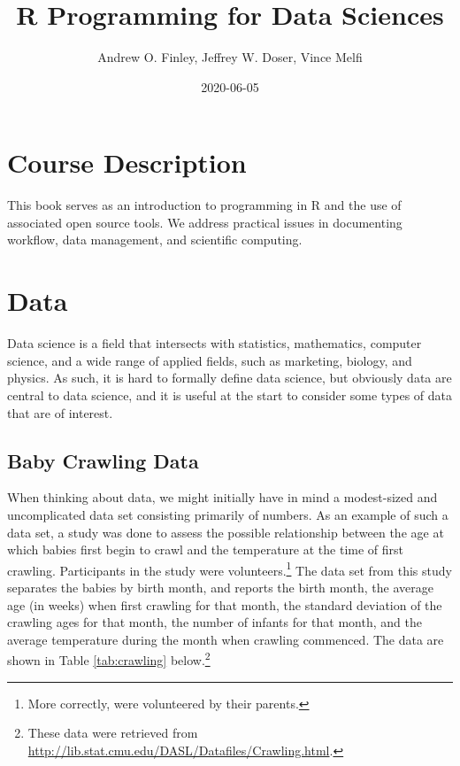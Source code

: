 \documentclass[
]{krantz}
\title{R Programming for Data Sciences}
\author{Andrew O. Finley, Jeffrey W. Doser, Vince Melfi}
\date{2020-06-05}
\begin{document}
\maketitle


\thispagestyle{empty}

\setlength{\abovedisplayskip}{-5pt}
\setlength{\abovedisplayshortskip}{-5pt}

{
\hypersetup{linkcolor=}
\setcounter{tocdepth}{2}
\tableofcontents
}
\listoftables
\listoffigures
\hypertarget{course-description}{%
\chapter*{Course Description}\label{course-description}}


This book serves as an introduction to programming in R and the use of associated open source tools. We address practical issues in documenting workflow, data management, and scientific computing.

\mainmatter

\hypertarget{data}{%
\chapter{Data}\label{data}}

Data science is a field that intersects with statistics, mathematics, computer science, and a wide range of applied fields, such as marketing, biology, and physics. As such, it is hard to formally define data science, but obviously data are central to data science, and it is useful at the start to consider some types of data that are of interest.

\hypertarget{baby-crawling-data}{%
\section{Baby Crawling Data}\label{baby-crawling-data}}

When thinking about data, we might initially have in mind a modest-sized and uncomplicated data set consisting primarily of numbers. As an example of such a data set, a study was done to assess the possible relationship between the age at which babies first begin to crawl and the temperature at the time of first crawling. Participants in the study were volunteers.\footnote{More correctly, were volunteered by their parents.} The data set from this study separates the babies by birth month, and reports the birth month, the average age (in weeks) when first crawling for that month, the standard deviation of the crawling ages for that month, the number of infants for that month, and the average temperature during the month when crawling commenced. The data are shown in Table \ref{tab:crawling} below.\footnote{These data were retrieved from \url{http://lib.stat.cmu.edu/DASL/Datafiles/Crawling.html}.}
\end{document}
